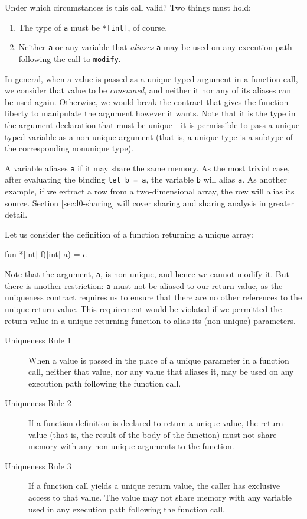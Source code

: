 Under which circumstances is this call valid?  Two things must hold:
\begin{enumerate}
\item The type of \texttt{a} must be \texttt{*[int]}, of course.

\item Neither \texttt{a} or any variable that \textit{aliases}
  \texttt{a} may be used on any execution path following the call to
  \texttt{modify}.
\end{enumerate}

In general, when a value is passed as a unique-typed argument in a
function call, we consider that value to be \textit{consumed}, and
neither it nor any of its aliases can be used again.  Otherwise, we
would break the contract that gives the function liberty to manipulate
the argument however it wants.  Note that it is the type in the
argument declaration that must be unique - it is permissible to pass a
unique-typed variable as a non-unique argument (that is, a unique type
is a subtype of the corresponding nonunique type).

A variable aliases \texttt{a} if it may share the same memory.  As the
most trivial case, after evaluating the binding \texttt{let b = a},
the variable \texttt{b} will alias \texttt{a}.  As another example, if
we extract a row from a two-dimensional array, the row will alias its
source.  Section \ref{sec:l0-sharing} will cover sharing and sharing
analysis in greater detail.

Let us consider the definition of a function returning a unique array:

\begin{colorcode}
fun *[int] f([int] a) = \(e\)
\end{colorcode}

Note that the argument, \texttt{a}, is non-unique, and hence we cannot
modify it.  But there is another restriction: \texttt{a} must not be
aliased to our return value, as the uniqueness contract requires us to
ensure that there are no other references to the unique return value.
This requirement would be violated if we permitted the return value in
a unique-returning function to alias its (non-unique) parameters.

\begin{description}
\item[Uniqueness Rule 1] When a value is passed in the place of a
  unique parameter in a function call, neither that value, nor any
  value that aliases it, may be used on any execution path following
  the function call.

\item[Uniqueness Rule 2] If a function definition is declared to
  return a unique value, the return value (that is, the result of the
  body of the function) must not share memory with any non-unique
  arguments to the function.

\item[Uniqueness Rule 3] If a function call yields a unique
  return value, the caller has exclusive access to that value.  The
  value may not share memory with any variable used in any execution
  path following the function call.
\end{description}

